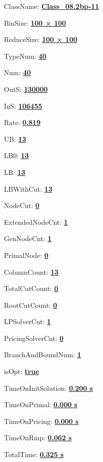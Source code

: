 \documentclass[11pt]{article}
\begin{document}
\pagestyle{empty}


ClassName: \underline{\textbf{Class_08.2bp-11}}
\par
BinSize: \underline{\textbf{100 × 100}}
\par
ReduceSize: \underline{\textbf{100 × 100}}
\par
TypeNum: \underline{\textbf{40}}
\par
Num: \underline{\textbf{40}}
\par
OutS: \underline{\textbf{130000}}
\par
InS: \underline{\textbf{106455}}
\par
Rate: \underline{\textbf{0.819}}
\par
UB: \underline{\textbf{13}}
\par
LB0: \underline{\textbf{13}}
\par
LB: \underline{\textbf{13}}
\par
LBWithCut: \underline{\textbf{13}}
\par
NodeCut: \underline{\textbf{0}}
\par
ExtendedNodeCnt: \underline{\textbf{1}}
\par
GenNodeCnt: \underline{\textbf{1}}
\par
PrimalNode: \underline{\textbf{0}}
\par
ColumnCount: \underline{\textbf{13}}
\par
TotalCutCount: \underline{\textbf{0}}
\par
RootCutCount: \underline{\textbf{0}}
\par
LPSolverCnt: \underline{\textbf{1}}
\par
PricingSolverCnt: \underline{\textbf{0}}
\par
BranchAndBoundNum: \underline{\textbf{1}}
\par
isOpt: \underline{\textbf{true}}
\par
TimeOnInitSolution: \underline{\textbf{0.200 s}}
\par
TimeOnPrimal: \underline{\textbf{0.000 s}}
\par
TimeOnPricing: \underline{\textbf{0.000 s}}
\par
TimeOnRmp: \underline{\textbf{0.062 s}}
\par
TotalTime: \underline{\textbf{0.325 s}}
\par
\newpage


\end{document}
